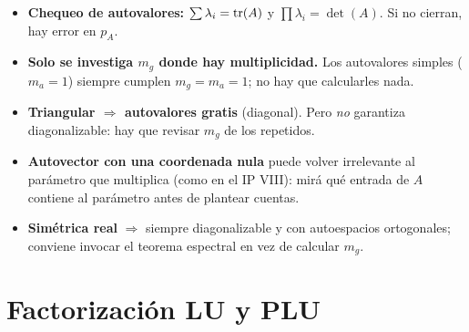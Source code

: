 \begin{truco}
\begin{itemize}
\item \textbf{Chequeo de autovalores:} $\sum \lambda_i = \operatorname{tr}(A)$ y $\prod \lambda_i = \det(A)$. Si no cierran, hay error en $p_A$.
\item \textbf{Solo se investiga $m_g$ donde hay multiplicidad.} Los autovalores simples ($m_a = 1$) siempre cumplen $m_g = m_a = 1$; no hay que calcularles nada.
\item \textbf{Triangular $\Rightarrow$ autovalores gratis} (diagonal). Pero \emph{no} garantiza diagonalizable: hay que revisar $m_g$ de los repetidos.
\item \textbf{Autovector con una coordenada nula} puede volver irrelevante al parámetro que multiplica (como en el IP VIII): mirá qué entrada de $A$ contiene al parámetro antes de plantear cuentas.
\item \textbf{Simétrica real} $\Rightarrow$ siempre diagonalizable y con autoespacios ortogonales; conviene invocar el teorema espectral en vez de calcular $m_g$.
\end{itemize}
\end{truco}


\section{Factorización LU y PLU}

